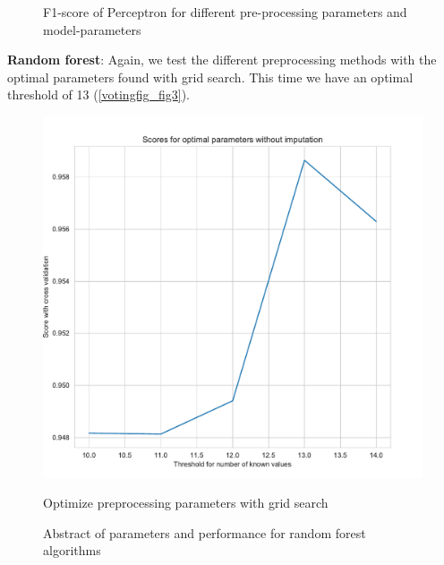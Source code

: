 \documentclass[11pt]{article}
\begin{document}
\begin{figure}
\begin{minipage}[t]{0.3\textwidth}
\end{minipage}
   \caption{F1-score of Perceptron for different pre-processing parameters and model-parameters}
\label{votingfig_fig2}
\end{figure}

\textbf{Random forest}: Again, we test the different preprocessing methods with the optimal parameters found with grid search. This time we have an optimal threshold of 13 (\ref{votingfig_fig3}). 

\begin{figure}
\begin{minipage}[t]{0.3\textwidth}
\includegraphics[width=1\linewidth]{voting/threshold_grid_rdf0.pdf}
\caption{Optimize preprocessing parameters with grid search}
\label{votingfig_fig3}
\end{minipage}
\begin{minipage}[t]{0.7\textwidth}
\centering
{}
    \caption{Abstract of parameters and performance for random forest algorithms}
    \label{tab_voting1}
\end{minipage}
\end{figure}
\end{document}
